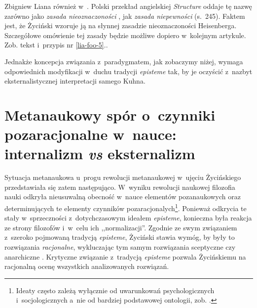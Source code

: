 \begin{artplenv}{Zbigniew Liana}
{również w~\parencite[s.~159]{zycinski_teizm_1985}.
Polski przekład angielskiej
\textit{Structure} oddaje tę nazwę zarówno jako \textit{zasada nieoznaczoności}
\parencite[s.~240]{zycinski_struktura_2013},
jak \textit{zasada niepewności}
(s.~245).
Faktem jest, że
Życiński wzoruje ją na słynnej zasadzie nieoznaczoności Heisenberga. Szczegółowe omówienie tej zasady będzie możliwe
dopiero w~kolejnym artykule. Zob. tekst i~przypis nr \ref{lia-foo-5}.}.

Jednakże koncepcja związania z~paradygmatem, jak zobaczymy niżej, wymaga odpowiednich modyfikacji w~duchu tradycji
\textit{episteme} tak, by je oczyścić z~nazbyt eksternalistycznej interpretacji samego Kuhna.

\section{Metanaukowy spór o~czynniki pozaracjonalne w~nauce: internalizm \textit{vs} eksternalizm}\label{lia-sec-5}

Sytuacja metanaukowa u~progu rewolucji metanaukowej w~ujęciu Życińskiego przedstawiała się zatem następująco. W~wyniku
rewolucji naukowej filozofia nauki odkryła nieusuwalną obecność w~nauce elementów pozanaukowych oraz determinujących te
elementy czynników pozaracjonalych\footnote{Ideaty często zależą wyłącznie od uwarunkowań
psychologicznych i~socjologicznych a~nie od bardziej podstawowej ontologii, zob.
\parencites[s.~29]{zycinski_structure_1988}[s.~51]{zycinski_struktura_2013}.
}. Ponieważ odkrycia te stały w~sprzeczności z~dotychczasowym ideałem \textit{episteme}, konieczna była
reakcja ze strony filozofów i~w~celu ich ,,normalizacji''. Zgodnie ze swym związaniem z~szeroko pojmowaną tradycją
\textit{episteme}, Życiński stawia wymóg, by były to rozwiązania \textit{racjonalne}, wykluczając tym samym rozwiązania
sceptyczne czy anarchiczne
\parencites[s.~143]{zycinski_structure_1988}[s.~254]{zycinski_struktura_2013}.
Krytyczne
związanie z~tradycją \textit{episteme} pozwala Życińskiemu na racjonalną ocenę wszystkich analizowanych rozwiązań.


\end{artplenv}
